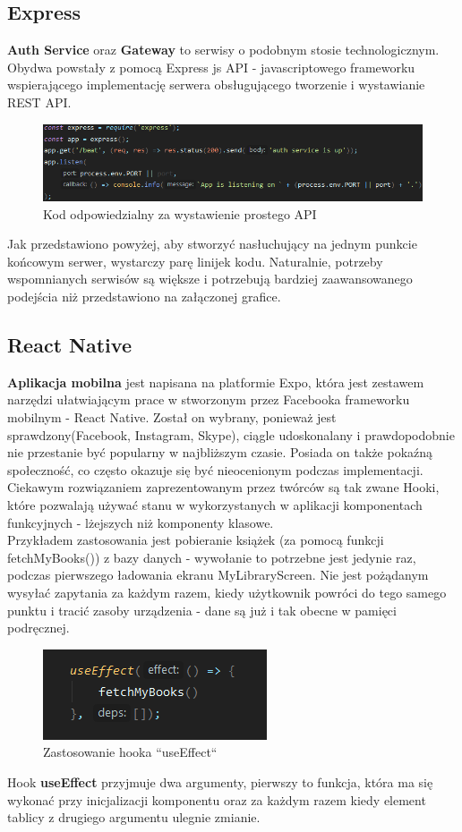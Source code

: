 \subsection{Express}
\textbf{Auth Service} oraz \textbf{Gateway} to serwisy o podobnym stosie technologicznym. Obydwa powstały z pomocą Express js API - javascriptowego frameworku wspierającego implementację serwera obsługującego tworzenie i wystawianie REST API.
\begin{figure}[H]
	\centering
	\includegraphics[width=\linewidth]{express_simple.png}
	\caption{Kod odpowiedzialny za wystawienie prostego API}
\end{figure}
Jak przedstawiono powyżej, aby stworzyć nasłuchujący na jednym punkcie końcowym serwer, wystarczy parę linijek kodu. Naturalnie, potrzeby wspomnianych serwisów są większe i potrzebują bardziej zaawansowanego podejścia niż przedstawiono na załączonej grafice.

\subsection{React Native}
\textbf{Aplikacja mobilna} jest napisana na platformie Expo, która jest zestawem narzędzi ułatwiającym prace w stworzonym przez Facebooka frameworku mobilnym - React Native. Został on wybrany, ponieważ jest sprawdzony(Facebook, Instagram, Skype), ciągle udoskonalany i prawdopodobnie nie przestanie być popularny w najbliższym czasie. Posiada on także pokaźną społeczność, co często okazuje się być nieocenionym podczas implementacji.\\
Ciekawym rozwiązaniem zaprezentowanym przez twórców są tak zwane Hooki, które pozwalają używać stanu w wykorzystanych w aplikacji komponentach funkcyjnych - lżejszych niż komponenty klasowe.\\

Przykładem zastosowania jest pobieranie książek (za pomocą funkcji fetchMyBooks()) z bazy danych - wywołanie to potrzebne jest jedynie raz, podczas pierwszego ładowania ekranu MyLibraryScreen. Nie jest pożądanym wysyłać zapytania za każdym razem, kiedy użytkownik powróci do tego samego punktu i tracić zasoby urządzenia - dane są już i tak obecne w pamięci podręcznej. 
\begin{figure}[H]
	\centering
	\includegraphics{hook.png}
	\caption{Zastosowanie hooka ``useEffect``}
\end{figure}
Hook \textbf{useEffect} przyjmuje dwa argumenty, pierwszy to funkcja, która ma się wykonać przy inicjalizacji komponentu oraz za każdym razem kiedy element tablicy z drugiego argumentu ulegnie zmianie.

